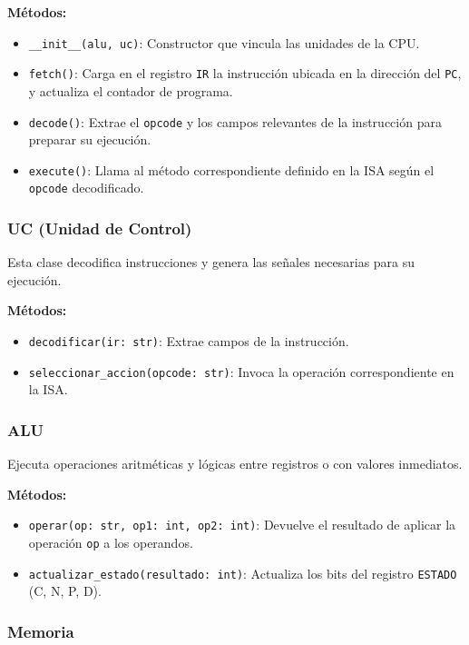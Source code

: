 \documentclass{article}
\begin{document}
\textbf{Métodos:}
\begin{itemize}
  \item \texttt{\_\_init\_\_(alu, uc)}: Constructor que vincula las unidades de la CPU.
  \item \texttt{fetch()}: Carga en el registro \texttt{IR} la instrucción ubicada en la
        dirección del \texttt{PC}, y actualiza el contador de programa.
  \item \texttt{decode()}: Extrae el \texttt{opcode} y los campos relevantes de
        la instrucción para preparar su ejecución.
  \item \texttt{execute()}: Llama al método correspondiente definido en la ISA
        según el \texttt{opcode} decodificado.
\end{itemize}

\subsubsection*{UC (Unidad de Control)}

Esta clase decodifica instrucciones y genera las señales necesarias para su ejecución.

\textbf{Métodos:}
\begin{itemize}
  \item \texttt{decodificar(ir: str)}: Extrae campos de la instrucción.
  \item \texttt{seleccionar\_accion(opcode: str)}: Invoca la operación correspondiente en la ISA.
\end{itemize}

\subsubsection*{ALU}

Ejecuta operaciones aritméticas y lógicas entre registros o con valores inmediatos.

\textbf{Métodos:}
\begin{itemize}
  \item \texttt{operar(op: str, op1: int, op2: int)}: Devuelve el resultado de aplicar
        la operación \texttt{op} a los operandos.
  \item \texttt{actualizar\_estado(resultado: int)}: Actualiza los bits del
        registro \texttt{ESTADO} (C, N, P, D).
\end{itemize}

\subsubsection*{Memoria}
\end{document}
